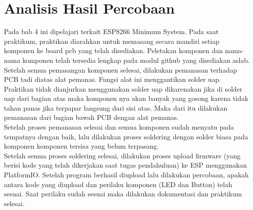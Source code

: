 \section*{Analisis Hasil Percobaan}
\indent
Pada bab 4 ini dipelajari terkait ESP8266 Minimum System. Pada saat praktikum, praktikan diarahkan untuk memasang secara mandiri setiap komponen ke board pcb yang telah disediakan. Peletakan komponen dan nama-nama komponen telah tersedia lengkap pada modul github yang disediakan aslab. 
\\ \indent 
Setelah semua pemasangan komponen selesai, dilakukan pemanasan terhadap PCB tadi diatas alat pemanas. Fungsi alat ini menggantikan solder uap. Praktikan tidak dianjurkan menggunakan solder uap dikarenakan jika di solder uap dari bagian atas maka komponen nya akan banyak yang gosong karena tidak tahan panas jika terpapar langsung dari sisi atas. Maka dari itu dilakukan pemanasan dari bagian bawah PCB dengan alat pemanas.
\\ \indent 
Setelah proses pemanasan selesai dan semua komponen sudah menyatu pada tempatnya dengan baik, lalu dilakukan proses soldering dengan solder biasa pada komponen komponen tersisa yang belum terpasang.
\\ \indent 
Setelah semua proses soldering selesai, dilakukan proses upload firmware (yang berisi kode yang telah dikerjakan saat tugas pendahuluan) ke ESP menggunakan PlatformIO. Setelah program berhasil diupload lalu dilakukan percobaan, apakah antara kode yang diupload dan perilaku komponen (LED dan Button) telah sesuai. Saat perilaku sudah sesuai maka dilakukan dokumentasi dan praktikum selesai.

